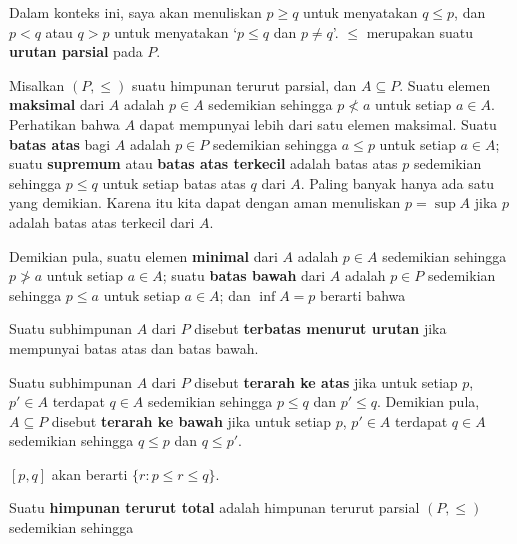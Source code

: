 \noindent Dalam konteks ini, saya akan menuliskan $p\ge q$ untuk menyatakan
$q\le p$, dan $p<q$ atau $q>p$ untuk menyatakan `$p\le q$ dan $p\ne q$'.
$\le$ merupakan suatu {\bf urutan parsial} pada $P$.

 Misalkan $(P,\le)$ suatu himpunan terurut parsial,
dan $A\subseteq P$. Suatu elemen {\bf maksimal} dari $A$ adalah $p\in A$
sedemikian sehingga $p\not<a$ untuk setiap $a\in A$. Perhatikan bahwa $A$
dapat mempunyai lebih dari satu elemen maksimal. Suatu {\bf batas atas} bagi
$A$ adalah $p\in P$ sedemikian sehingga $a\le p$ untuk setiap $a\in A$;
suatu {\bf supremum} atau {\bf batas atas terkecil} adalah batas atas $p$
sedemikian sehingga $p\le q$ untuk setiap batas atas $q$ dari $A$. Paling
banyak hanya ada satu yang demikian. Karena itu kita
dapat dengan aman menuliskan $p=\sup A$ jika $p$ adalah batas atas terkecil
dari $A$.

Demikian pula, suatu elemen {\bf minimal} dari $A$ adalah $p\in A$ sedemikian
sehingga $p\not>a$ untuk setiap $a\in A$; suatu {\bf batas bawah} dari $A$
adalah $p\in P$ sedemikian sehingga $p\le a$ untuk setiap $a\in A$; dan
$\inf A=p$ berarti bahwa


Suatu subhimpunan $A$ dari $P$ disebut {\bf terbatas menurut urutan} jika
mempunyai batas atas dan batas bawah.

Suatu subhimpunan $A$ dari $P$ disebut {\bf terarah ke atas} jika untuk
setiap $p$, $p'\in A$ terdapat $q\in A$ sedemikian sehingga $p\le q$ dan
$p'\le q$. Demikian pula, $A\subseteq P$ disebut
{\bf terarah ke bawah} jika untuk setiap $p$, $p'\in A$ terdapat $q\in A$
sedemikian sehingga $q\le p$ dan $q\le p'$.

 $[p,q]$ akan berarti
$\{r:p\le r\le q\}$.


 Suatu {\bf himpunan terurut total} adalah himpunan
terurut parsial $(P,\le)$ sedemikian sehingga


